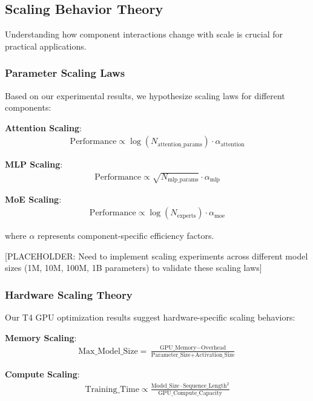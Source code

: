 \documentclass[11pt,a4paper]{article}
\begin{document}
\subsection{Scaling Behavior Theory}

Understanding how component interactions change with scale is crucial for practical applications.

\subsubsection{Parameter Scaling Laws}

Based on our experimental results, we hypothesize scaling laws for different components:

\textbf{Attention Scaling}:
\begin{align}
\text{Performance} \propto \log(N_{\text{attention\_params}}) \cdot \alpha_{\text{attention}}
\end{align}

\textbf{MLP Scaling}:
\begin{align}
\text{Performance} \propto \sqrt{N_{\text{mlp\_params}}} \cdot \alpha_{\text{mlp}}
\end{align}

\textbf{MoE Scaling}:
\begin{align}
\text{Performance} \propto \log(N_{\text{experts}}) \cdot \alpha_{\text{moe}}
\end{align}

where $\alpha$ represents component-specific efficiency factors.

[PLACEHOLDER: Need to implement scaling experiments across different model sizes (1M, 10M, 100M, 1B parameters) to validate these scaling laws]

\subsubsection{Hardware Scaling Theory}

Our T4 GPU optimization results suggest hardware-specific scaling behaviors:

\textbf{Memory Scaling}:
\begin{align}
\text{Max\_Model\_Size} = \frac{\text{GPU\_Memory} - \text{Overhead}}{\text{Parameter\_Size} + \text{Activation\_Size}}
\end{align}

\textbf{Compute Scaling}:
\begin{align}
\text{Training\_Time} \propto \frac{\text{Model\_Size} \cdot \text{Sequence\_Length}^2}{\text{GPU\_Compute\_Capacity}}
\end{align}
\end{document}
